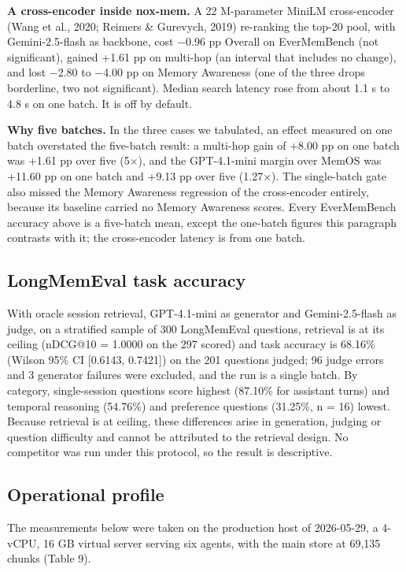 \documentclass[a4paper,fleqn]{cas-sc}
\begin{document}
\textbf{A cross-encoder inside nox-mem.} A 22 M-parameter MiniLM cross-encoder (Wang et al., 2020; Reimers \& Gurevych, 2019) re-ranking the top-20 pool, with Gemini-2.5-flash as backbone, cost −0.96 pp Overall on EverMemBench (not significant), gained +1.61 pp on multi-hop (an interval that includes no change), and lost −2.80 to −4.00 pp on Memory Awareness (one of the three drops borderline, two not significant). Median search latency rose from about 1.1 s to 4.8 s on one batch. It is off by default.

\textbf{Why five batches.} In the three cases we tabulated, an effect measured on one batch overstated the five-batch result: a multi-hop gain of +8.00 pp on one batch was +1.61 pp over five (5×), and the GPT-4.1-mini margin over MemOS was +11.60 pp on one batch and +9.13 pp over five (1.27×). The single-batch gate also missed the Memory Awareness regression of the cross-encoder entirely, because its baseline carried no Memory Awareness scores. Every EverMemBench accuracy above is a five-batch mean, except the one-batch figures this paragraph contrasts with it; the cross-encoder latency is from one batch.

\subsection{LongMemEval task accuracy}

With oracle session retrieval, GPT-4.1-mini as generator and Gemini-2.5-flash as judge, on a stratified sample of 300 LongMemEval questions, retrieval is at its ceiling (nDCG@10 = 1.0000 on the 297 scored) and task accuracy is 68.16\% (Wilson 95\% CI {[}0.6143, 0.7421{]}) on the 201 questions judged; 96 judge errors and 3 generator failures were excluded, and the run is a single batch. By category, single-session questions score highest (87.10\% for assistant turns) and temporal reasoning (54.76\%) and preference questions (31.25\%, n = 16) lowest. Because retrieval is at ceiling, these differences arise in generation, judging or question difficulty and cannot be attributed to the retrieval design. No competitor was run under this protocol, so the result is descriptive.

\subsection{Operational profile}

The measurements below were taken on the production host of 2026-05-29, a 4-vCPU, 16 GB virtual server serving six agents, with the main store at 69,135 chunks (Table 9).
\end{document}
